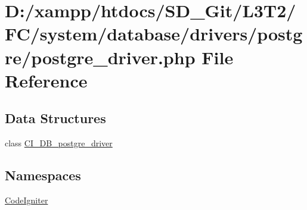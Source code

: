 \hypertarget{postgre__driver_8php}{}\section{D\+:/xampp/htdocs/\+S\+D\+\_\+\+Git/\+L3\+T2/\+F\+C/system/database/drivers/postgre/postgre\+\_\+driver.php File Reference}
\label{postgre__driver_8php}
\subsection*{Data Structures}
\begin{DoxyCompactItemize}
\item 
class \hyperlink{class_c_i___d_b__postgre__driver}{C\+I\+\_\+\+D\+B\+\_\+postgre\+\_\+driver}
\end{DoxyCompactItemize}
\subsection*{Namespaces}
\begin{DoxyCompactItemize}
\item 
 \hyperlink{namespace_code_igniter}{Code\+Igniter}
\end{DoxyCompactItemize}
